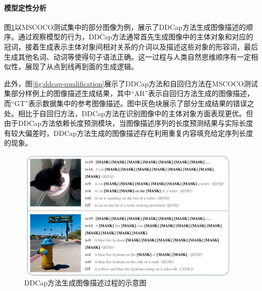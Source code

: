 \paragraph{模型定性分析} 图\ref{fig:ddcap-generate-order}以MSCOCO测试集中的部分图像为例，展示了DDCap方法生成图像描述的顺序。通过观察模型的行为，DDCap方法通常首先生成图像中的主体对象和对应的冠词，接着生成表示主体对象间相对关系的介词以及描述这些对象的形容词，最后生成其他名词、动词等使得句子语法正确。这一过程与人类自然思维顺序有一定相似性，展现了从点到线再到面的生成逻辑。

此外，图\ref{fig:ddcap-qualification}展示了DDCap方法和自回归方法在MSCOCO测试集部分样例上的图像描述生成结果，其中“AR”表示自回归方法生成的图像描述，而“GT”表示数据集中的参考图像描述。图中灰色块展示了部分生成结果的错误之处。相比于自回归方法，DDCap方法在识别图像中的主体对象方面表现更优。但由于DDCap方法依赖长度预测模块，当图像描述序列的长度预测结果与实际长度有较大偏差时，DDCap方法生成的图像描述存在利用重复内容填充给定序列长度的现象。

\begin{figure}
  \centering
  \includegraphics[width=1.0\linewidth]{figures/ddcap-generate-order.pdf}
  \caption{DDCap方法生成图像描述过程的示意图}
  \label{fig:ddcap-generate-order}
\end{figure}

